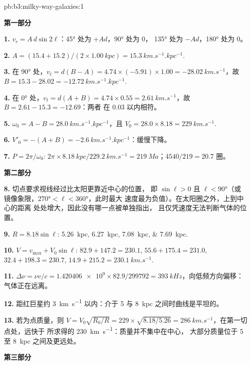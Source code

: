 \begin{solution}{pb:b3:milky-way-galaxies:1}

\textbf{第一部分}

\textbf{1.} $v_r = A\,d\sin2\ell$：\ang{45} 处为 $+A d$，\ang{90} 处为 0，
\ang{135} 处为 $-A d$，\ang{180} 处为 0。

\textbf{2.} $A = (15.4 + 15.2)/(2\times\qty{1.00}{kpc}) =
\qty{15.3}{km.s^{-1}.kpc^{-1}}$.

\textbf{3.} 在 \ang{90} 处，$v_t = d(B - A) = 4.74\times(-5.91)\times1.00 =
\qty{-28.02}{km.s^{-1}}$，故 $B = 15.3 - 28.02 =
\qty{-12.72}{km.s^{-1}.kpc^{-1}}$.

\textbf{4.} 在 \ang{0} 处，$v_t = d(A + B) = 4.74\times0.55 =
\qty{2.61}{km.s^{-1}}$，故 $B = 2.61 - 15.3 = \num{-12.69}$：两者
在 \num{0.03} 以内相符。

\textbf{5.} $\omega_0 = A - B = \qty{28.0}{km.s^{-1}.kpc^{-1}}$，且
$V_0 = 28.0\times8.18 = \qty{229}{km.s^{-1}}$.

\textbf{6.} $V'_0 = -(A + B) = \qty{-2.6}{km.s^{-1}.kpc^{-1}}$：缓慢下降。

\textbf{7.} $P = 2\pi/\omega_0$: $2\pi\times\qty{8.18}{kpc}/\qty{229.2}{km.s^{-1}}
= \qty{219}{Ma}$；$4540/219 = 20.7$ 圈。

\textbf{第二部分}

\textbf{8.} 切点要求视线经过比太阳更靠近中心的位置，
即 $\sin\ell > 0$ 且 $\ell < \ang{90}$（或
镜像象限，$\ang{270} < \ell < \ang{360}$，此时最大
速度最为负值）。在太阳圈之外，上到中心的距离
处处增大，因此没有哪一点被单独指出，
且仅凭速度无法判断气体的位置。

\textbf{9.} $R = 8.18\sin\ell$: \qtylist{5.26;6.27;7.08;7.69}{kpc}.

\textbf{10.} $V = v_\mathrm{max} + V_0\sin\ell$: $82.9 + 147.2 = 230.1$,
$55.6 + 175.4 = 231.0$, $32.4 + 198.3 = 230.7$, $14.9 + 215.2 =
\qty{230.1}{km.s^{-1}}$.

\textbf{11.} $\Delta\nu = \nu v/c = \num{1.420406e9}\times82.9/299792 =
\qty{393}{kHz}$，向低频方向偏移：气体正在远离。

\textbf{12.} 距红巨星约 \qty{3}{km.s^{-1}} 以内：介于 5 与
\qty{8}{kpc} 之间时曲线是平坦的。

\textbf{13.} 若为点质量，则 $V = V_0\sqrt{R_0/R} = 229\times\sqrt{8.18/5.26} =
\qty{286}{km.s^{-1}}$，在第一切点处，远快于
所求得的 \qty{230}{km.s^{-1}}：质量并不集中在中心，
大部分质量位于 5 至 \qty{8}{kpc} 之间及更远处。

\textbf{第三部分}


\end{solution}
